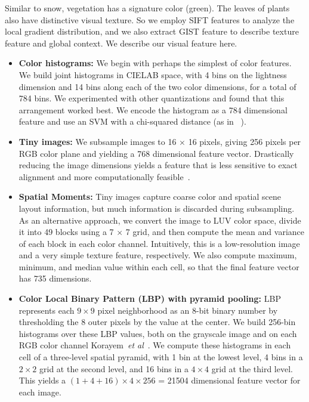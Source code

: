 Similar to snow, vegetation has a signature color (green). 
The leaves of plants also have distinctive visual texture. So we employ SIFT features to analyze the local gradient distribution, and we also extract GIST feature to describe texture feature and global context. 
We describe our visual feature here.

\begin{itemize}
	\item{\textbf{Color histograms:}} We begin with perhaps the simplest of color
	features. We build joint histograms in CIELAB space, with 4 bins on
	the lightness dimension and 14 bins along each of the two color
	dimensions, for a total of 784 bins. We experimented with other
	quantizations and found that this arrangement worked best.  We encode
	the histogram as a 784 dimensional feature and use an SVM with a
	chi-squared distance (as in ~\cite{XiaoHEOT10}).
	\item{\textbf{Tiny images:}} 
	We subsample images to 16 $\times$ 16 pixels, giving 256 pixels per
	RGB color plane and yielding a 768 dimensional feature vector.
	Drastically reducing the image dimensions yields a feature that is
	less sensitive to exact alignment and more computationally
	feasible~\cite{torralba2008tiny}.  
	\item \textbf{Spatial Moments:} Tiny images capture coarse color and spatial
	scene layout information, but much information is discarded during
	subsampling.  As an alternative approach, we convert the image to LUV
	color space, divide it into 49 blocks using a 7 $\times$ 7 grid, and
	then compute the mean and variance of each block in each color
	channel.  Intuitively, this is a low-resolution image and a very
	simple texture feature, respectively.  We also compute maximum,
	minimum, and median value within each cell, so that the final
	feature vector has 735 dimensions.
	\item \textbf{Color Local Binary Pattern (LBP) with pyramid
		pooling:} LBP represents each $9 \times 9$ pixel neighborhood 
	as an 8-bit binary number by thresholding the 8 outer pixels
	by the value at the center.  We build 256-bin histograms over
	these LBP values, both on the grayscale image and on each RGB color
	channel Korayem~\textit{et al}~\cite{korayem2012solving}. We compute these histograms in each cell of a three-level spatial
	pyramid, with 1 bin at the lowest level, 4 bins in a $2 \times 2$ grid
	at the second level, and 16 bins in a $4 \times 4$ grid at the third level.
	This yields a $(1+4+16) \times 4 \times 256$ = 21504 dimensional feature
	vector for each image.
	

\end{itemize}
